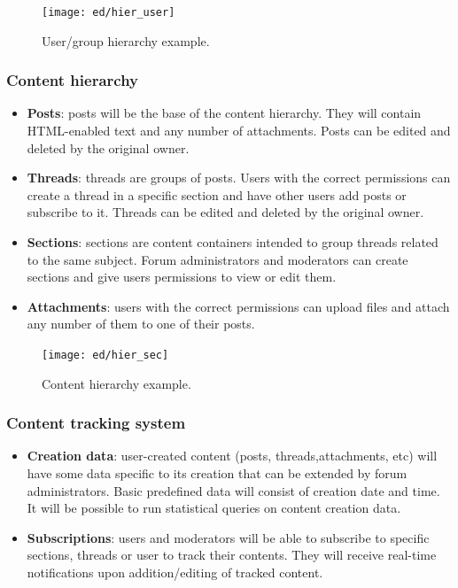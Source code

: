 \documentclass[12pt]{report}
\renewcommand\emph{\textbf}
\begin{document}
                    \begin{figure}[!htb]
                    \caption{User/group hierarchy example.}
                    \centering
                    \texttt{[image: ed/hier\_user]}
                    \end{figure}

                 \subsubsection{Content hierarchy}
                    \begin{itemize}
                        \item \emph{Posts}: posts will be the base of the content hierarchy. They will contain HTML-enabled text and any number of attachments.
                        Posts can be edited and deleted by the original owner.
                        \item \emph{Threads}: threads are groups of posts. Users with the correct permissions can create a thread in a specific section and have other users add posts or subscribe to it.
                        Threads can be edited and deleted by the original owner.
                        \item \emph{Sections}: sections are content containers intended to group threads related to the same subject. Forum administrators and moderators can create sections and give users permissions to view or edit them.
                        \item \emph{Attachments}: users with the correct permissions can upload files and attach any number of them to one of their posts.
                    \end{itemize}

                    \begin{figure}[!htb]
                    \caption{Content hierarchy example.}
                    \centering
                    \texttt{[image: ed/hier\_sec]}
                    \end{figure}

                  \subsubsection{Content tracking system}
                    \begin{itemize}
                        \item \emph{Creation data}: user-created content (posts, threads,attachments, etc) will have some data specific to its creation that can be extended by forum administrators. Basic predefined data will consist of creation date and time. It will be possible to run statistical queries on content creation data.
                        \item \emph{Subscriptions}: users and moderators will be able to subscribe to specific sections, threads or user to track their contents. They will receive real-time notifications upon addition/editing of tracked content.
                    \end{itemize}
\end{document}
